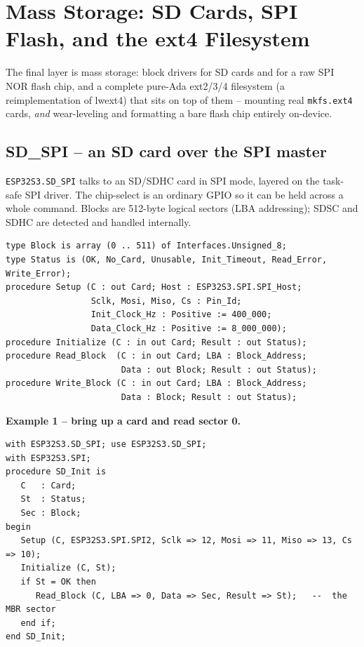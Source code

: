 \chapter{Mass Storage: SD Cards, SPI Flash, and the ext4 Filesystem}
\label{ch:storage}

The final layer is mass storage: block drivers for SD cards and for a raw SPI NOR
flash chip, and a complete pure-Ada ext2/3/4 filesystem (a reimplementation of
lwext4) that sits on top of them -- mounting real \texttt{mkfs.ext4} cards,
\emph{and} wear-leveling and formatting a bare flash chip entirely on-device.

\section{SD\_SPI -- an SD card over the SPI master}

\texttt{ESP32S3.SD\_SPI} talks to an SD/SDHC card in SPI mode, layered on the
task-safe SPI driver. The chip-select is an ordinary GPIO so it can be held across
a whole command. Blocks are 512-byte logical sectors (LBA addressing); SDSC and
SDHC are detected and handled internally.

\begin{lstlisting}
type Block is array (0 .. 511) of Interfaces.Unsigned_8;
type Status is (OK, No_Card, Unusable, Init_Timeout, Read_Error, Write_Error);
procedure Setup (C : out Card; Host : ESP32S3.SPI.SPI_Host;
                 Sclk, Mosi, Miso, Cs : Pin_Id;
                 Init_Clock_Hz : Positive := 400_000;
                 Data_Clock_Hz : Positive := 8_000_000);
procedure Initialize (C : in out Card; Result : out Status);
procedure Read_Block  (C : in out Card; LBA : Block_Address;
                       Data : out Block; Result : out Status);
procedure Write_Block (C : in out Card; LBA : Block_Address;
                       Data : Block; Result : out Status);
\end{lstlisting}

\textbf{Example 1 -- bring up a card and read sector 0.}
\begin{lstlisting}
with ESP32S3.SD_SPI; use ESP32S3.SD_SPI;
with ESP32S3.SPI;
procedure SD_Init is
   C   : Card;
   St  : Status;
   Sec : Block;
begin
   Setup (C, ESP32S3.SPI.SPI2, Sclk => 12, Mosi => 11, Miso => 13, Cs => 10);
   Initialize (C, St);
   if St = OK then
      Read_Block (C, LBA => 0, Data => Sec, Result => St);   --  the MBR sector
   end if;
end SD_Init;
\end{lstlisting}

